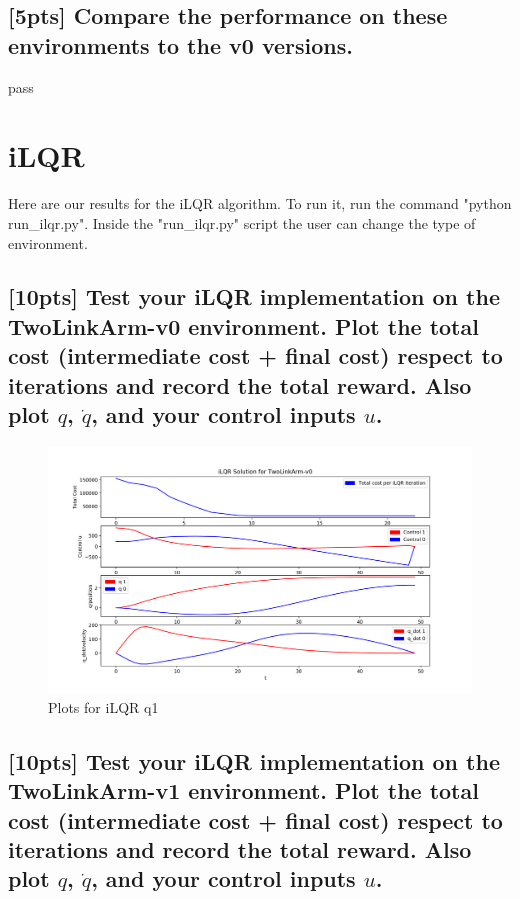 \documentclass{article}
\begin{document}
\subsection{[5pts] Compare the performance on these environments to the v0 versions.}

pass





\section{iLQR}
Here are our results for the iLQR algorithm. To run it, run the command "python run\_ilqr.py". Inside the "run\_ilqr.py" script the user can change the type of environment.

\subsection{[10pts] Test your iLQR implementation on the TwoLinkArm-v0 environment. Plot the total cost (intermediate cost + final cost) respect to iterations and record the total reward. Also plot $q$, $\dot{q}$, and your control inputs $u$.}

\begin{figure}[H] \label{fig:ilqr_qn1}
  \centering
  \includegraphics[width=1.2\textwidth]{images/ilqr_qn1}
  \caption{Plots for iLQR q1}
\end{figure}

\subsection{[10pts] Test your iLQR implementation on the TwoLinkArm-v1 environment. Plot the total cost (intermediate cost + final cost) respect to iterations and record the total reward. Also plot $q$, $\dot{q}$, and your control inputs $u$.}
\end{document}
